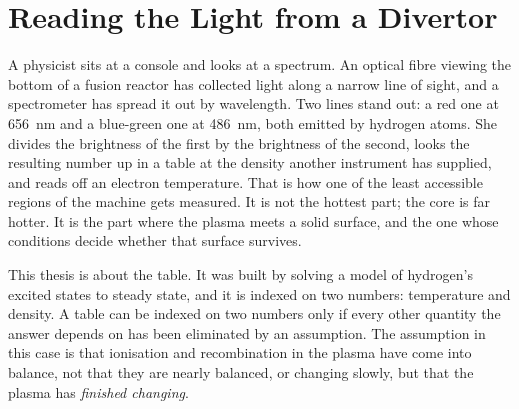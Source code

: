 %
%
%

\chapter{Reading the Light from a Divertor}
\label{ch:intro}

A physicist sits at a console and looks at a spectrum. An optical fibre viewing
the bottom of a fusion reactor has collected light along a narrow line of sight,
and a spectrometer has spread it out by wavelength. Two lines stand out: a red
one at \SI{656}{\nano\metre} and a blue-green one at \SI{486}{\nano\metre}, both
emitted by hydrogen atoms. She divides the brightness of the first by the
brightness of the second, looks the resulting number up in a table at the
density another instrument has supplied, and reads off an electron temperature. That is how one of the
least accessible regions of the machine gets measured. It is not the hottest
part; the core is far hotter. It is the part where the plasma meets a solid
surface, and the one whose conditions decide whether that surface survives.

This thesis is about the table. It was built by solving a model of hydrogen's
excited states to steady state, and it is indexed on two numbers: temperature
and density. A table can be indexed on two numbers only if every other quantity
the answer depends on has been eliminated by an assumption. The assumption in
this case is that ionisation and recombination in the plasma have come into
balance, not that they are nearly balanced, or changing slowly, but that the
plasma has \emph{finished changing}.

